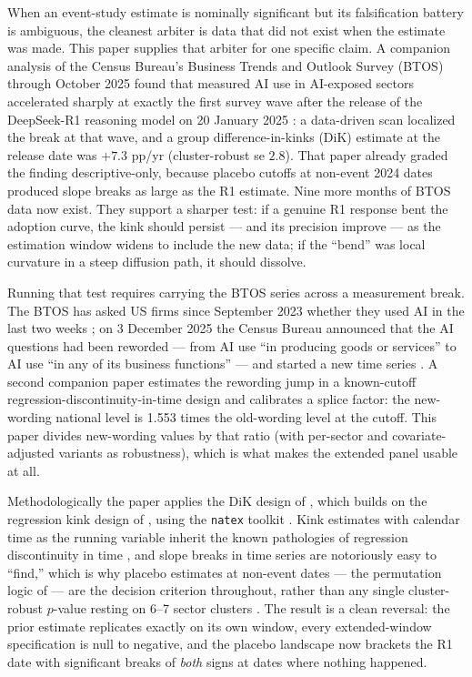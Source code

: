 \documentclass[11pt]{article}
\newcommand{\natex}{\texttt{natex}}
\begin{document}
When an event-study estimate is nominally significant but its falsification
battery is ambiguous, the cleanest arbiter is data that did not exist when the
estimate was made. This paper supplies that arbiter for one specific claim. A
companion analysis \cite{hillebrandt2026r1} of the Census Bureau's Business
Trends and Outlook Survey (BTOS) through October 2025 found that measured AI
use in AI-exposed sectors accelerated sharply at exactly the first survey wave
after the release of the DeepSeek-R1 reasoning model on 20 January 2025
\cite{guo2025}: a data-driven scan localized the break at that wave, and a
group difference-in-kinks (DiK) estimate at the release date was $+7.3$ pp/yr
(cluster-robust se $2.8$). That paper already graded the finding
descriptive-only, because placebo cutoffs at non-event 2024 dates produced
slope breaks as large as the R1 estimate. Nine more months of BTOS data now
exist. They support a sharper test: if a genuine R1 response bent the adoption
curve, the kink should persist --- and its precision improve --- as the
estimation window widens to include the new data; if the ``bend'' was local
curvature in a steep diffusion path, it should dissolve.

Running that test requires carrying the BTOS series across a measurement
break. The BTOS has asked US firms since September 2023 whether they used AI
in the last two weeks \cite{bonney2024}; on 3 December 2025 the Census Bureau
announced that the AI questions had been reworded --- from AI use ``in
producing goods or services'' to AI use ``in any of its business functions''
--- and started a new time series \cite{census2025}. A second companion paper
\cite{hillebrandt2026rewording} estimates the rewording jump in a known-cutoff
regression-discontinuity-in-time design and calibrates a splice factor: the
new-wording national level is 1.553 times the old-wording level at the cutoff.
This paper divides new-wording values by that ratio (with per-sector and
covariate-adjusted variants as robustness), which is what makes the extended
panel usable at all.

Methodologically the paper applies the DiK design of \cite{bockerman2025},
which builds on the regression kink design of \cite{card2015}, using the
\natex{} toolkit \cite{natex}. Kink estimates with calendar time as the
running variable inherit the known pathologies of regression discontinuity in
time \cite{hausman2018}, and slope breaks in time series are notoriously easy
to ``find,'' which is why placebo estimates at non-event dates --- the
permutation logic of \cite{ganong2018} --- are the decision criterion
throughout, rather than any single cluster-robust $p$-value resting on 6--7
sector clusters \cite{cameron2015}. The result is a clean reversal: the prior
estimate replicates exactly on its own window, every extended-window
specification is null to negative, and the placebo landscape now brackets the
R1 date with significant breaks of \emph{both} signs at dates where nothing
happened.
\end{document}
